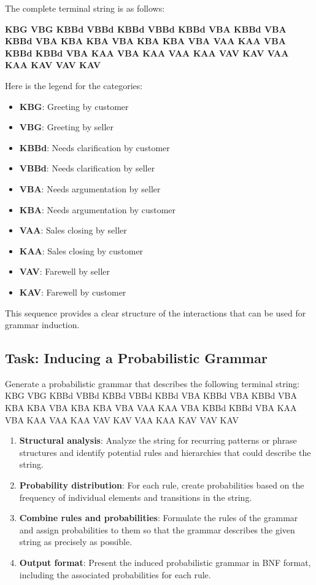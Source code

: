 \documentclass[
]{article}
\begin{document}
The complete terminal string is as follows:

\textbf{KBG VBG KBBd VBBd KBBd VBBd KBBd VBA KBBd VBA KBBd VBA KBA KBA VBA KBA KBA VBA VAA KAA VBA KBBd KBBd VBA KAA VBA KAA VAA KAA VAV KAV VAA KAA KAV VAV KAV}

Here is the legend for the categories:

\begin{itemize}
\item
  \textbf{KBG}: Greeting by customer
\item
  \textbf{VBG}: Greeting by seller
\item
  \textbf{KBBd}: Needs clarification by customer
\item
  \textbf{VBBd}: Needs clarification by seller
\item
  \textbf{VBA}: Needs argumentation by seller
\item
  \textbf{KBA}: Needs argumentation by customer
\item
  \textbf{VAA}: Sales closing by seller
\item
  \textbf{KAA}: Sales closing by customer
\item
  \textbf{VAV}: Farewell by seller
\item
  \textbf{KAV}: Farewell by customer
\end{itemize}

This sequence provides a clear structure of the interactions that can be used for grammar induction.

\subsection{Task: Inducing a Probabilistic Grammar}\label{task-inducing-a-probabilistic-grammar}

Generate a probabilistic grammar that describes the following terminal string: KBG VBG KBBd VBBd KBBd VBBd KBBd VBA KBBd VBA KBBd VBA KBA KBA VBA KBA KBA VBA VAA KAA VBA KBBd KBBd VBA KAA VBA KAA VAA KAA VAV KAV VAA KAA KAV VAV KAV

\begin{enumerate}
\def\labelenumi{\arabic{enumi}.}
\item \textbf{Structural analysis}: Analyze the string for recurring patterns or phrase structures and identify potential rules and hierarchies that could describe the string.
\item \textbf{Probability distribution}: For each rule, create probabilities based on the frequency of individual elements and transitions in the string.
\item \textbf{Combine rules and probabilities}: Formulate the rules of the grammar and assign probabilities to them so that the grammar describes the given string as precisely as possible.
\item \textbf{Output format}: Present the induced probabilistic grammar in BNF format, including the associated probabilities for each rule.
\end{enumerate}
\end{document}
